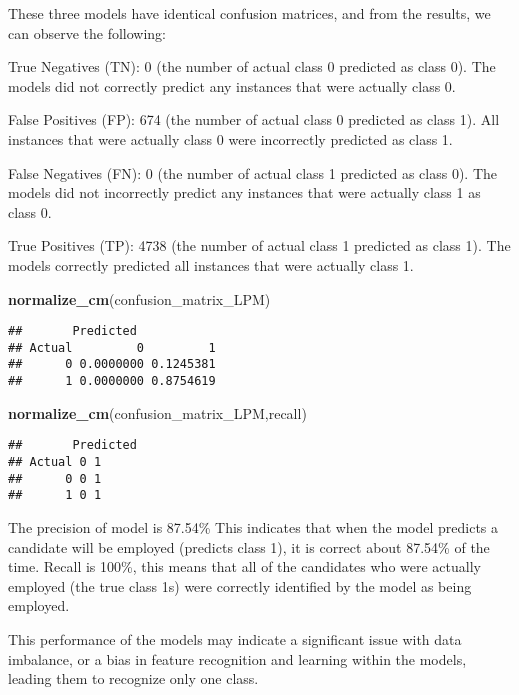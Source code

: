 \documentclass[
]{article}
\newenvironment{Shaded}{\begin{snugshade}}{\end{snugshade}}
\newcommand{\FunctionTok}[1]{\textcolor[rgb]{0.13,0.29,0.53}{\textbf{#1}}}
\newcommand{\NormalTok}[1]{#1}
\newcommand{\StringTok}[1]{\textcolor[rgb]{0.31,0.60,0.02}{#1}}
\begin{document}
These three models have identical confusion matrices, and from the
results, we can observe the following:

True Negatives (TN): 0 (the number of actual class 0 predicted as class
0). The models did not correctly predict any instances that were
actually class 0.

False Positives (FP): 674 (the number of actual class 0 predicted as
class 1). All instances that were actually class 0 were incorrectly
predicted as class 1.

False Negatives (FN): 0 (the number of actual class 1 predicted as class
0). The models did not incorrectly predict any instances that were
actually class 1 as class 0.

True Positives (TP): 4738 (the number of actual class 1 predicted as
class 1). The models correctly predicted all instances that were
actually class 1.

\begin{Shaded}
\begin{Highlighting}[]
\FunctionTok{normalize\_cm}\NormalTok{(confusion\_matrix\_LPM)}
\end{Highlighting}
\end{Shaded}

\begin{verbatim}
##       Predicted
## Actual         0         1
##      0 0.0000000 0.1245381
##      1 0.0000000 0.8754619
\end{verbatim}

\begin{Shaded}
\begin{Highlighting}[]
\FunctionTok{normalize\_cm}\NormalTok{(confusion\_matrix\_LPM,}\StringTok{\textquotesingle{}recall\textquotesingle{}}\NormalTok{)}
\end{Highlighting}
\end{Shaded}

\begin{verbatim}
##       Predicted
## Actual 0 1
##      0 0 1
##      1 0 1
\end{verbatim}

The precision of model is 87.54\% This indicates that when the model
predicts a candidate will be employed (predicts class 1), it is correct
about 87.54\% of the time. Recall is 100\%, this means that all of the
candidates who were actually employed (the true class 1s) were correctly
identified by the model as being employed.

This performance of the models may indicate a significant issue with
data imbalance, or a bias in feature recognition and learning within the
models, leading them to recognize only one class.
\end{document}

